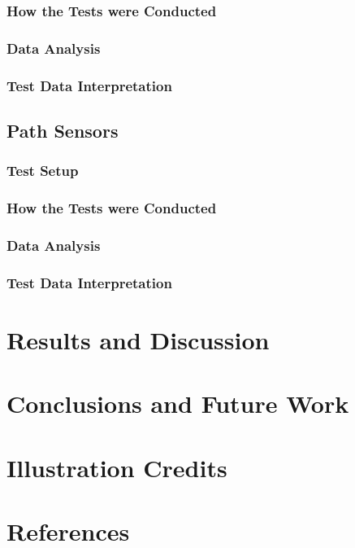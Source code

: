 \documentclass[12pt]{article}
\begin{document}
\subsubsection{How the Tests were Conducted}

\subsubsection{Data Analysis}

\subsubsection{Test Data Interpretation}

\subsection{Path Sensors}
\subsubsection{Test Setup}

\subsubsection{How the Tests were Conducted}

\subsubsection{Data Analysis}

\subsubsection{Test Data Interpretation}


\section{Results and Discussion}

\section{Conclusions and Future Work}

\section{Illustration Credits}

\section{References}
\end{document}
